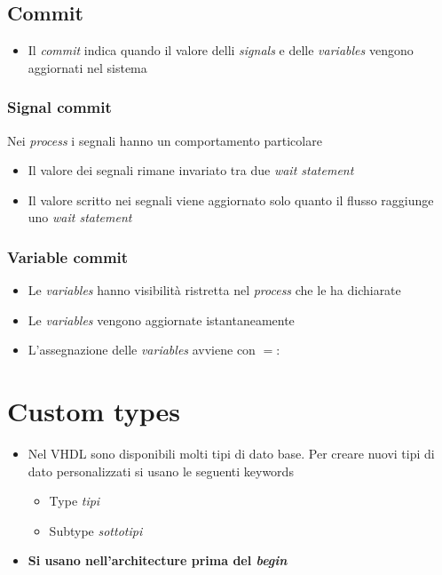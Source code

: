 \documentclass{article}
\begin{document}
\subsection{Commit}
\begin{itemize}
	\item Il \textit{commit} indica quando il valore delli \textit{signals} e delle \textit{variables} vengono aggiornati nel sistema
\end{itemize}
\subsubsection{Signal commit}
Nei \textit{process} i segnali hanno un comportamento particolare
\begin{itemize}
	\item Il valore dei segnali rimane invariato tra due \textit{wait statement}
	\item Il valore scritto nei segnali viene aggiornato solo quanto il flusso raggiunge uno \textit{wait statement}
\end{itemize}
\subsubsection{Variable commit}
\begin{itemize}
	\item Le \textit{variables} hanno visibilità ristretta nel \textit{process} che le ha dichiarate
	\item Le \textit{variables} vengono aggiornate istantaneamente
	\item L'assegnazione delle \textit{variables} avviene con \(=:\)
\end{itemize}

\section{Custom types}
\begin{itemize}
	\item Nel VHDL sono disponibili molti tipi di dato base. Per creare nuovi tipi di dato personalizzati si usano le seguenti keywords
	      \begin{itemize}
	      	\item Type \textit{tipi}
	      	\item Subtype \textit{sottotipi}
	      \end{itemize}
	\item \textbf{Si usano nell'architecture prima del \textit{begin}}
\end{itemize}
\end{document}
